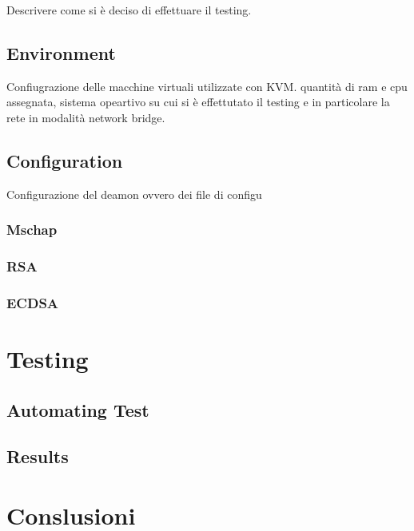 \documentclass[
10pt, %
a4paper, %
oneside, %
headinclude,footinclude, %
BCOR5mm, %
]{scrartcl}
\begin{document}
Descrivere come si è deciso di effettuare il testing.

\subsection{Environment}

Confiugrazione delle macchine virtuali utilizzate con KVM. quantità di ram e cpu assegnata, sistema opeartivo su cui si è
effettutato il testing e in particolare la rete in modalità network bridge.

\subsection{Configuration} 

Configurazione del deamon ovvero dei file di configu

\subsubsection{Mschap}

\subsubsection{RSA}

\subsubsection{ECDSA}



\section{Testing}

\subsection{Automating Test}

\subsection{Results}

\section{Conslusioni}
\end{document}

